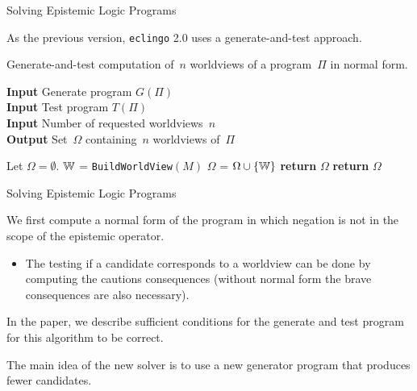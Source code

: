 \documentclass[aspectratio=169,svgnames,xcolor=table,t]{beamer}
\begin{document}
\begin{frame}{Solving Epistemic Logic Programs}
    \begin{myitemize}
        \item[] As the previous version, \texttt{eclingo} 2.0 uses a generate-and-test approach.
    \end{myitemize}
    \begin{algorithm}[H]
        \scriptsize
        \caption{Generate-and-test computation of~$n$ worldviews of a program~$\Pi$ in normal form.}\label{alg:guess-and-check}
        \hspace*{\algorithmicindent} \textbf{Input} Generate program $G(\Pi)$\\
        \hspace*{\algorithmicindent} \textbf{Input} Test program $T(\Pi)$\\
        \hspace*{\algorithmicindent} \textbf{Input} Number of requested worldviews~$n$\\
        \hspace*{\algorithmicindent} \textbf{Output} Set~$\Omega$ containing~$n$  worldviews of~$\Pi$
    
        \begin{algorithmic}[1] %
            \STATE Let $\Omega=\emptyset$.
             \label{alg.generator.loop.ini}
                \STATE $\mathbb{W}$ = \texttt{BuildWorldView$(M)$}
                \STATE $\Omega$ = $\Omega \cup \{ \mathbb{W} \}$
                    \STATE \textbf{return} $\Omega$
                    \ENDIF
                \ENDIF
            \ENDFOR \label{alg.generator.loop.end}
            \STATE \textbf{return} $\Omega$
        \end{algorithmic}
    \end{algorithm}
\end{frame}
\begin{frame}{Solving Epistemic Logic Programs}
    \begin{myitemize}
        \item We first compute a normal form of the program in which negation is not in the scope of the epistemic operator.
        \begin{itemize}
            \item The testing if a candidate corresponds to a worldview can be done by computing the cautions consequences (without normal form the brave consequences are also necessary).
        \end{itemize}
        
        \item In the paper, we describe sufficient conditions for the generate and test program for this algorithm to be correct.
        
        \item The main idea of the new solver is to use a new generator program that produces fewer candidates.
    \end{myitemize}
\end{frame}
\end{document}
